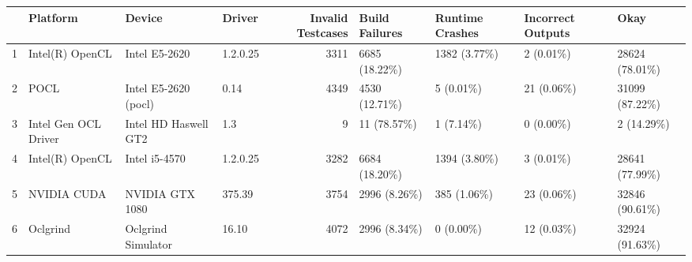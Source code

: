 \begin{tabular}{llllrllll}
\toprule
{} &              Platform &                Device &    Driver &  Invalid Testcases & Build Failures & Runtime Crashes & Incorrect Outputs &            Okay \\
\midrule
1 &       Intel(R) OpenCL &         Intel E5-2620 &  1.2.0.25 &               3311 &  6685 (18.22\%) &    1382 (3.77\%) &         2 (0.01\%) &  28624 (78.01\%) \\
2 &                  POCL &  Intel E5-2620 (pocl) &      0.14 &               4349 &  4530 (12.71\%) &       5 (0.01\%) &        21 (0.06\%) &  31099 (87.22\%) \\
3 &  Intel Gen OCL Driver &  Intel HD Haswell GT2 &       1.3 &                  9 &    11 (78.57\%) &       1 (7.14\%) &         0 (0.00\%) &      2 (14.29\%) \\
4 &       Intel(R) OpenCL &         Intel i5-4570 &  1.2.0.25 &               3282 &  6684 (18.20\%) &    1394 (3.80\%) &         3 (0.01\%) &  28641 (77.99\%) \\
5 &           NVIDIA CUDA &       NVIDIA GTX 1080 &    375.39 &               3754 &   2996 (8.26\%) &     385 (1.06\%) &        23 (0.06\%) &  32846 (90.61\%) \\
6 &              Oclgrind &    Oclgrind Simulator &     16.10 &               4072 &   2996 (8.34\%) &       0 (0.00\%) &        12 (0.03\%) &  32924 (91.63\%) \\
\bottomrule
\end{tabular}
